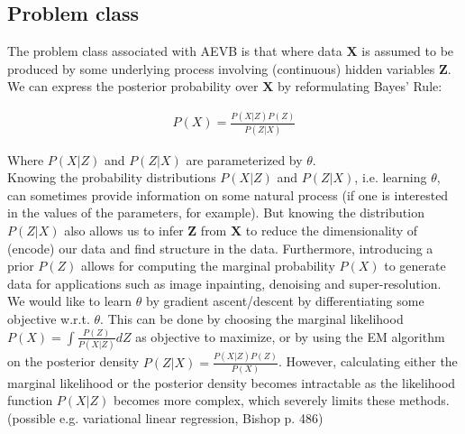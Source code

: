 \documentclass{article}
\begin{document}
\subsection*{Problem class}

The problem class associated with AEVB is that where data $\mathbf{X}$ is assumed to be produced by some underlying process involving (continuous) hidden variables $\mathbf{Z}$. We can express the posterior probability over $\mathbf{X}$ by reformulating Bayes' Rule:

\begin{align}
P(X) = \frac{P(X|Z)P(Z)}{P(Z|X)}
\end{align}

Where $P(X|Z)$ and $P(Z|X)$ are parameterized by $\theta$.
\\

Knowing the probability distributions $P(X|Z)$ and $P(Z|X)$, i.e. learning $\theta$, can sometimes provide information on some natural process (if one is interested in the values of the parameters, for example). But knowing the distribution $P(Z|X)$ also allows us to infer $\mathbf{Z}$ from $\mathbf{X}$ to reduce the dimensionality of (encode) our data and find structure in the data. Furthermore, introducing a prior $P(Z)$ allows for computing the marginal probability $P(X)$ to generate data for applications such as image inpainting, denoising and super-resolution.
We would like to learn $\theta$ by gradient ascent/descent by differentiating some objective w.r.t. $\theta$. This can be done by choosing the marginal likelihood $P(X) = \int \frac{P(Z)}{P(X|Z)}dZ$ as objective to maximize, or by using the EM algorithm on the posterior density $ P(Z|X) = \frac{P(X|Z)P(Z)}{P(X)}$. However, calculating either  the marginal likelihood or the posterior density becomes intractable as the likelihood function $P(X|Z)$	 becomes more complex, which severely limits these methods. (possible e.g. variational linear regression, Bishop p. 486)





\end{document}
